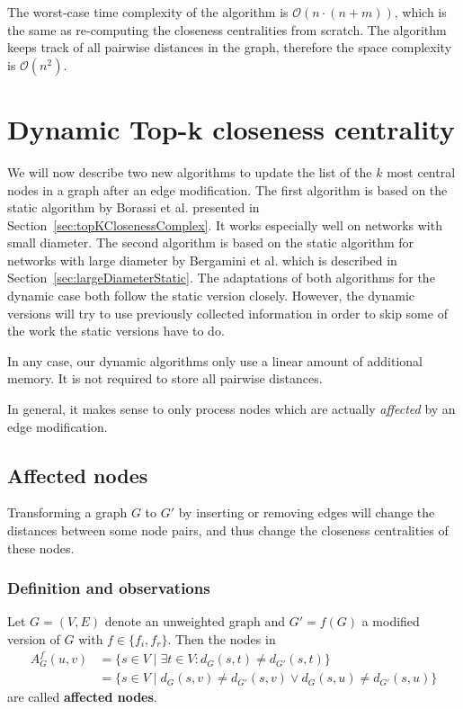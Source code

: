 The worst-case time complexity of the algorithm is $\mathcal{O}(n \cdot (n + m))$, which is the same as re-computing the closeness centralities from scratch. The algorithm keeps track of all pairwise distances in the graph, therefore the space complexity is $\mathcal{O}(n^2)$. 

\section{Dynamic Top-k closeness centrality}
We will now describe two new algorithms to update the list of the $k$ most central nodes in a graph after an edge modification. The first algorithm is based on the static algorithm by Borassi et al. presented in Section~\ref{sec:topKClosenessComplex}. It works especially well on networks with small diameter. The second algorithm is based on the static algorithm for networks with large diameter by Bergamini et al. which is described in Section~\ref{sec:largeDiameterStatic}. The adaptations of both algorithms for the dynamic case both follow the static version closely. However, the dynamic versions will try to use previously collected information in order to skip some of the work the static versions have to do.

In any case, our dynamic algorithms only use a linear amount of additional memory. It is not required to store all pairwise distances.

In general, it makes sense to only process nodes which are actually \emph{affected} by an edge modification. 

\subsection{Affected nodes}

Transforming a graph $G$ to $G'$ by inserting or removing edges will change the distances between some node pairs, and thus change the closeness centralities of these nodes.

\subsubsection{Definition and observations}

\begin{definition}
\label{def:affectedNodes}
	Let $G = (V, E)$ denote an unweighted graph and $G' = f(G)$ a modified version of $G$ with $f \in \{f_i, f_r\}$. Then the nodes in 
	\begin{align}
		A_G^f(u, v) &= \{s \in V \mid \exists t \in V : d_G(s,t) \neq d_{G'}(s, t)\} \label{eq:affectedNodesGeneral} \\
		            &=\{s \in V \mid d_G(s, v) \neq d_{G'}(s, v) \lor d_G(s, u) \neq d_{G'}(s, u)\} \label{eq:affectedNodesSimplified}
	\end{align} are called \textbf{affected nodes}.
\end{definition}
 

